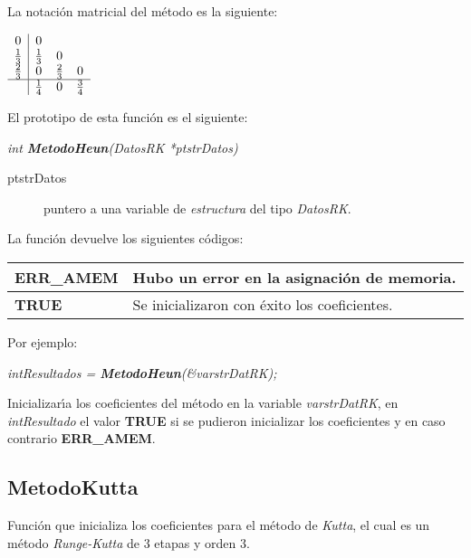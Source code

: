 La notaci\'on matricial del m\'etodo es la siguiente:

\begin{center}
$
\begin{array}{c|ccc}
0 & 0 \\
\frac{1}{3} & \frac{1}{3} & 0 \\
\frac{2}{3} & 0 & \frac{2}{3} & 0 \\
\hline
 & \frac{1}{4} & 0 & \frac{3}{4}
\end{array}
$
\end{center}

El prototipo de esta funci\'on es el siguiente:

\begin{center}
\emph{int \textbf{MetodoHeun}(DatosRK *ptstrDatos)}
\end{center}

\begin{description}
\item[ptstrDatos] puntero a una variable de \emph{estructura} del tipo
\emph{DatosRK}.
\end{description}

La funci\'on devuelve los siguientes c\'odigos:

\begin{center}
\begin{tabular}{|l|l|}
\hline
\textbf{ERR\_AMEM} & Hubo un error en la asignaci\'on de memoria. \\
\hline
\textbf{TRUE} & Se inicializaron con \'exito los coeficientes. \\
\hline
\end{tabular}
\end{center}

Por ejemplo:

\begin{center}
\emph{intResultados = \textbf{MetodoHeun}(\&varstrDatRK);}
\end{center}

Inicializar\'{\i}a los coeficientes del m\'etodo en la variable
\emph{varstrDatRK}, en \emph{intResultado} el valor \textbf{TRUE} si se pudieron
inicializar los coeficientes y en caso contrario \textbf{ERR\_AMEM}.

\subsection{MetodoKutta}

Funci\'on que inicializa los coeficientes para el m\'etodo de \emph{Kutta}, el
cual es un m\'etodo \emph{Runge-Kutta} de $3$ etapas y orden $3$.\newline

